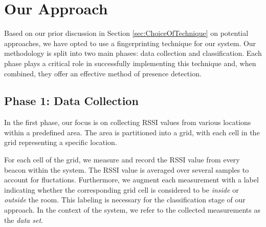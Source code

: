 
\section{Our Approach}\label{sec:our_approach}
Based on our prior discussion in Section \ref{sec:ChoiceOfTechnique} on potential approaches, we have opted to use a fingerprinting technique for our system.
Our methodology is split into two main phases: data collection and classification.
Each phase plays a critical role in successfully implementing this technique and, when combined, they offer an effective method of presence detection.

\subsection{Phase 1: Data Collection}\label{sec:phase1_data_collection}
In the first phase, our focus is on collecting RSSI values from various locations within a predefined area. The area is partitioned into a grid, with each cell in the grid representing a specific location. 

For each cell of the grid, we measure and record the RSSI value from every beacon within the system.
The RSSI value is averaged over several samples to account for fluctations.
Furthermore, we augment each measurement with a label indicating whether the corresponding grid cell is considered to be \textit{inside} or \textit{outside} the room.
This labeling is necessary for the classification stage of our approach.
In the context of the system, we refer to the collected measurements as the \textit{data set}.

